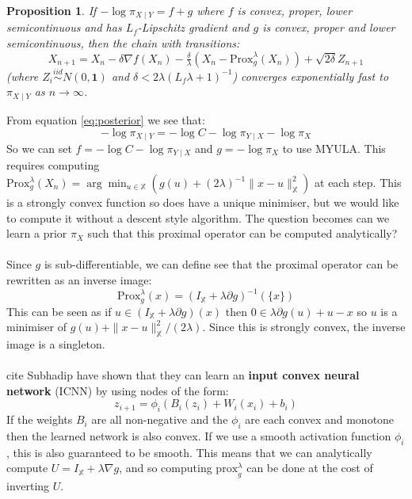 \documentclass[a4paper,10pt]{article}
\newtheorem{prop}[thm]{Proposition}
\def\cred{\color{red}}
\numberwithin{equation}{section}
\numberwithin{thm}{section}
\begin{document}
\begin{prop}
If $- \log \pi_{X \mid Y} = f + g $ where $f$ is convex, proper, lower semicontinuous and has $L_f$-Lipschitz gradient and $g$ is convex, proper and lower semicontinuous, then the chain with transitions:
\begin{equation}
\label{eq:MYULA}
X_{n+1} = X_n - \delta \nabla f(X_n) - \tfrac{\delta}{\lambda} ( X_n - \text{Prox}_g^\lambda (X_n) ) + \sqrt{2 \delta} Z_{n+1} \tag{MYULA}
\end{equation}
(where $Z_i \overset{iid}{\sim} N(0,\mathbf{1})$ and $\delta < 2 \lambda ( L_f \lambda + 1)^{-1}$) converges exponentially fast to $\pi_{X \mid Y}$ as $n \rightarrow \infty$.
\end{prop}
From equation \ref{eq:posterior} we see that:
\begin{equation}
- \log \pi_{X \mid Y} = - \log C - \log \pi_{Y \mid X} - \log \pi_X	
\end{equation}
So we can set $f = - \log C - \log \pi_{Y \mid X}$ and $g = - \log \pi_X$ to use MYULA. This requires computing $\text{Prox}_g^\lambda(X_n) = \arg\min_{u \in \mathbb{X} } ( g(u) + (2\lambda)^{-1} \| x - u \|_\mathbb{X}^2 )$ at each step. This is a strongly convex function so does have a unique minimiser, but we would like to compute it without a descent style algorithm. The question becomes can we learn a prior $\pi_X$ such that this proximal operator can be computed analytically? \\
\\
Since $g$ is sub-differentiable, we can define see that the proximal operator can be rewritten as an inverse image:
\begin{equation}
\text{Prox}_g^\lambda (x) = ( I_\mathbb{X} + \lambda \partial g )^{-1} ( \{x \} )	
\end{equation}
This can be seen as if $u \in (I_\mathbb{X} + \lambda \partial g)(x)$ then $0 \in \lambda \partial g (u) + u - x$ so $u$ is a minimiser of $g(u) + \| x - u \|^2_\mathbb{X} / (2 \lambda)$. Since this is strongly convex, the inverse image is a singleton. \\
\\
{\cred cite Subhadip} have shown that they can learn an \textbf{input convex neural network} (ICNN) by using nodes of the form:
\[ z_{i+1} = \phi_i ( B_i (z_i) + W_i(x_i) + b_i) \]
If the weights $B_i$ are all non-negative and the $\phi_i$ are each convex and monotone then the learned network is also convex. If we use a smooth activation function $\phi_i$, this is also guaranteed to be smooth. This means that we can analytically compute $U = I_\mathbb{X} + \lambda \nabla g$, and so computing $\text{prox}_g^\lambda$  can be done at the cost of inverting $U$.
\end{document}
